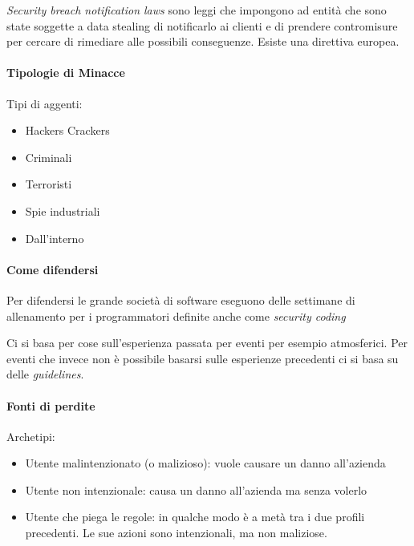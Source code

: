 
\textit{Security breach notification laws} sono leggi che impongono ad entità 
che sono state soggette a data stealing di notificarlo ai clienti e di prendere 
contromisure per cercare di rimediare alle possibili conseguenze. Esiste una 
direttiva europea.


\paragraph*{Tipologie di Minacce}

Tipi di aggenti:
\begin{itemize}
\item Hackers Crackers
\item Criminali
\item Terroristi
\item Spie industriali
\item Dall'interno
\end{itemize}


\paragraph*{Come difendersi}

Per difendersi le grande società di software eseguono delle settimane di 
allenamento per i programmatori definite anche come \textit{security coding}




Ci si basa per cose sull'esperienza passata per eventi per esempio atmosferici. 
Per eventi che invece non è possibile basarsi sulle esperienze precedenti ci si 
basa su delle \textit{guidelines}.

\paragraph*{Fonti di perdite}

Archetipi:
\begin{itemize}
\item Utente malintenzionato (o malizioso): vuole causare un danno all'azienda
\item Utente non intenzionale: causa un danno all'azienda ma senza volerlo
\item Utente che piega le regole: in qualche modo è a metà tra i due profili 
precedenti. Le sue azioni sono intenzionali, ma non maliziose.
\end{itemize}

